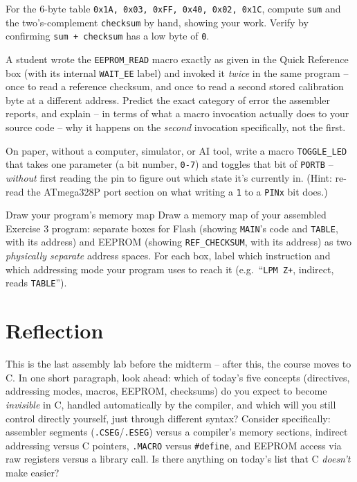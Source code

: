 \documentclass[11pt]{article}
\begin{document}
\takehomebanner

\begin{trace}
For the 6-byte table \texttt{0x1A, 0x03, 0xFF, 0x40, 0x02, 0x1C}, compute
\texttt{sum} and the two's-complement \texttt{checksum} by hand, showing your
work. Verify by confirming \texttt{sum + checksum} has a low byte of \texttt{0}.
\end{trace}

\begin{bug}
A student wrote the \texttt{EEPROM\_READ} macro exactly as given in the Quick
Reference box (with its internal \texttt{WAIT\_EE} label) and invoked it
\emph{twice} in the same program -- once to read a reference checksum, and once
to read a second stored calibration byte at a different address. Predict the
exact category of error the assembler reports, and explain -- in terms of what a
macro invocation actually does to your source code -- why it happens on the
\emph{second} invocation specifically, not the first.
\end{bug}

\begin{writecode}
On paper, without a computer, simulator, or AI tool, write a macro
\texttt{TOGGLE\_LED} that takes one parameter (a bit number, \texttt{0-7}) and
toggles that bit of \texttt{PORTB} -- \emph{without} first reading the pin to
figure out which state it's currently in. (Hint: re-read the ATmega328P port
section on what writing a \texttt{1} to a \texttt{PINx} bit does.)
\end{writecode}

\begin{drawex}{Draw your program's memory map}
Draw a memory map of your assembled Exercise 3 program: separate boxes for Flash
(showing \texttt{MAIN}'s code and \texttt{TABLE}, with its address) and EEPROM
(showing \texttt{REF\_CHECKSUM}, with its address) as two \emph{physically
separate} address spaces. For each box, label which instruction and which
addressing mode your program uses to reach it (e.g.\ ``\texttt{LPM Z+}, indirect,
reads \texttt{TABLE}'').
\end{drawex}

\section*{Reflection}

This is the last assembly lab before the midterm -- after this, the course moves
to C. In one short paragraph, look ahead: which of today's five concepts
(directives, addressing modes, macros, EEPROM, checksums) do you expect to become
\emph{invisible} in C, handled automatically by the compiler, and which will you
still control directly yourself, just through different syntax? Consider
specifically: assembler segments (\texttt{.CSEG}/\texttt{.ESEG}) versus a
compiler's memory sections, indirect addressing versus C pointers, \texttt{.MACRO}
versus \texttt{\#define}, and EEPROM access via raw registers versus a library
call. Is there anything on today's list that C \emph{doesn't} make easier?
\end{document}

